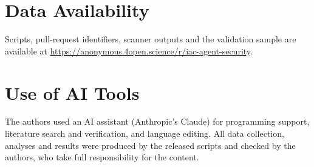 \documentclass[10pt,conference]{IEEEtran}
\begin{document}
\section*{Data Availability}\label{sec:data}
Scripts, pull-request identifiers, scanner outputs and the validation sample are available at \url{https://anonymous.4open.science/r/iac-agent-security}.

\section*{Use of AI Tools}
The authors used an AI assistant (Anthropic's Claude) for programming support, literature search and verification, and language editing. All data collection, analyses and results were produced by the released scripts and checked by the authors, who take full responsibility for the content.



\end{document}
